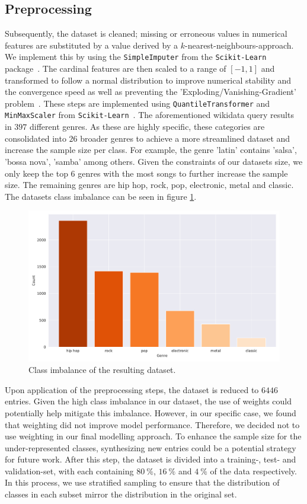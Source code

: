 \documentclass[
  12pt,
  bibliography=totoc,     %
  captions=tableheading,  %
  titlepage=firstiscover, %
]{scrartcl}
\begin{document}
\subsection{Preprocessing}
Subsequently, the dataset is cleaned; missing or erroneous values
in numerical features are substituted by a value derived by a $k$-nearest-neighbours-approach. We implement this
by using the \texttt{SimpleImputer} from the \texttt{Scikit-Learn} package~\cite{scikit-learn}.
The cardinal features are then scaled to a range of $[-1,1]$ and transformed to follow a normal distribution to improve numerical stability
and the convergence speed as well as preventing the 'Exploding/Vanishing-Gradient' problem~\cite{geron}. These steps are implemented using \texttt{QuantileTransformer} and
\texttt{MinMaxScaler} from \texttt{Scikit-Learn}~\cite{scikit-learn}.
The aforementioned wikidata query results in $397$ different genres. As these are highly specific, these categories are consolidated into $26$ broader genres to
achieve a more streamlined dataset and increase the sample size per class. For example, the genre 'latin' contains 'salsa', 'bossa nova', 'samba' among others.
Given the constraints of our datasets size, we only keep the top $6$ genres with the most songs to further increase the sample
size. The remaining genres are hip hop, rock, pop, electronic, metal and classic. The datasets class imbalance can be seen in figure \ref{fig:class-imbalance}.
\FloatBarrier
\begin{figure}[h]
  \centering
  \includegraphics[scale=0.6]{figures/genre_hist_oranges.pdf}
  \caption{Class imbalance of the resulting dataset.}
  \label{fig:class-imbalance}
\end{figure}
\FloatBarrier
\noindent
Upon application of the preprocessing steps, the dataset is reduced to $6446$ entries.
Given the high class imbalance in our dataset, the use of weights could potentially help mitigate this imbalance. However, in our specific case, we found that weighting did not improve model performance. Therefore, we decided not to use weighting in our final modelling approach.
To enhance the sample size for the under-represented classes, synthesizing new entries could be a potential strategy for future work.
After this step, the dataset is divided into a training-, test- and validation-set, with each containing $\SI{80}{\percent}$, $\SI{16}{\percent}$ and $\SI{4}{\percent}$
of the data respectively. In this process, we use stratified sampling to ensure that the distribution of classes in each subset mirror the distribution in the original
set.
\end{document}
